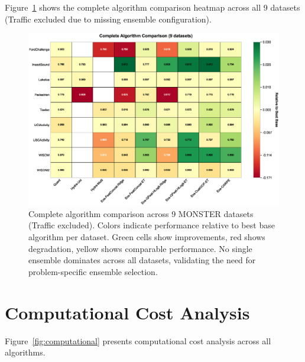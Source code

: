 \documentclass[pdflatex,sn-basic]{sn-jnl}           %
\theoremstyle{thmstyleone}%
\theoremstyle{thmstyletwo}%
\theoremstyle{thmstylethree}%
\begin{document}
\begin{appendices}
Figure~\ref{fig:full_heatmap} shows the complete algorithm comparison heatmap across all 9 datasets (Traffic excluded due to missing ensemble configuration).

\begin{figure}[!htb]
\centering
\includegraphics[width=\textwidth]{figureA1_full_heatmap}
\caption{Complete algorithm comparison across 9 MONSTER datasets (Traffic excluded). Colors indicate performance relative to best base algorithm per dataset. Green cells show improvements, red shows degradation, yellow shows comparable performance. No single ensemble dominates across all datasets, validating the need for problem-specific ensemble selection.}\label{fig:full_heatmap}
\end{figure}

\clearpage

\section{Computational Cost Analysis}\label{appE}
\setcounter{figure}{0}
\renewcommand{\thefigure}{E}

Figure~\ref{fig:computational} presents computational cost analysis across all algorithms.


\end{appendices}
\end{document}
